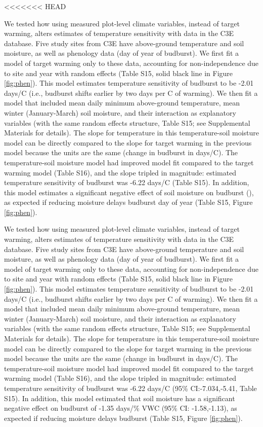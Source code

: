 \documentclass{article}
\begin{document}
<<<<<<< HEAD
\par We tested how using measured plot-level climate variables, instead of target warming, alters estimates of temperature sensitivity with data in the C3E database. Five study sites from C3E have above-ground temperature and soil moisture, as well as phenology data (day of year of budburst). We first fit a model of target warming only to these data, accounting for non-independence due to site and year with random effects (Table S15, solid black line in Figure \ref{fig:phen}). This model estimates temperature sensitivity of budburst to be -2.01 days/\degree C (i.e., budburst shifts earlier by two days per \degree C of warming). We then fit a model that included mean daily minimum above-ground temperature, mean winter (January-March) soil moisture, and their interaction as explanatory variables (with the same random effects structure, Table S15; see Supplemental Materials for details). The slope for temperature in this temperature-soil moisture model can be directly compared to the slope for target warming in the previous model because the units are the same (change in budburst in days/\degree C). The temperature-soil moisture model had improved model fit compared to the target warming model (Table S16), and the slope tripled in magnitude: estimated temperature sensitivity of budburst was -6.22 days/\degree C (Table S15). In addition, this model estimates a significant negative effect of soil moisture on budburst (), as expected if reducing moisture delays budburst day of year (Table S15, Figure \ref{fig:phen}).
\par We tested how using measured plot-level climate variables, instead of target warming, alters estimates of temperature sensitivity with data in the C3E database. Five study sites from C3E have above-ground temperature and soil moisture, as well as phenology data (day of year of budburst). We first fit a model of target warming only to these data, accounting for non-independence due to site and year with random effects (Table S15, solid black line in Figure \ref{fig:phen}). This model estimates temperature sensitivity of budburst to be -2.01 days/\degree C (i.e., budburst shifts earlier by two days per \degree C of warming). We then fit a model that included mean daily minimum above-ground temperature, mean winter (January-March) soil moisture, and their interaction as explanatory variables (with the same random effects structure, Table S15; see Supplemental Materials for details). The slope for temperature in this temperature-soil moisture model can be directly compared to the slope for target warming in the previous model because the units are the same (change in budburst in days/\degree C). The temperature-soil moisture model had improved model fit compared to the target warming model (Table S16), and the slope tripled in magnitude: estimated temperature sensitivity of budburst was -6.22 days/\degree C (95\% CI:-7.034,-5.41, Table S15). In addition, this model estimated that soil moisture has a significant negative effect on budburst of -1.35 days/\% VWC (95\% CI: -1.58,-1.13), as expected if reducing moisture delays budburst (Table S15, Figure \ref{fig:phen}).
\end{document}
